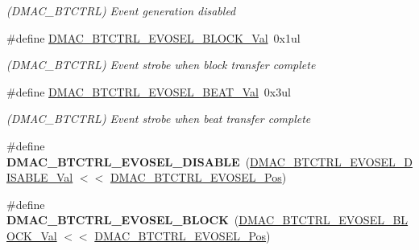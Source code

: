 \begin{DoxyCompactItemize}
\begin{DoxyCompactList}\small\item\em (D\+M\+A\+C\+\_\+\+B\+T\+C\+T\+R\+L) Event generation disabled \end{DoxyCompactList}\item 
\hypertarget{group___s_a_m_l21___d_m_a_c_gaff2ef572cd408dffc9b02f553e35031f}{}\#define \hyperlink{group___s_a_m_l21___d_m_a_c_gaff2ef572cd408dffc9b02f553e35031f}{D\+M\+A\+C\+\_\+\+B\+T\+C\+T\+R\+L\+\_\+\+E\+V\+O\+S\+E\+L\+\_\+\+B\+L\+O\+C\+K\+\_\+\+Val}~0x1ul\label{group___s_a_m_l21___d_m_a_c_gaff2ef572cd408dffc9b02f553e35031f}

\begin{DoxyCompactList}\small\item\em (D\+M\+A\+C\+\_\+\+B\+T\+C\+T\+R\+L) Event strobe when block transfer complete \end{DoxyCompactList}\item 
\hypertarget{group___s_a_m_l21___d_m_a_c_ga4b99d2ad5c89d62800f6f6d0c5fa0c3a}{}\#define \hyperlink{group___s_a_m_l21___d_m_a_c_ga4b99d2ad5c89d62800f6f6d0c5fa0c3a}{D\+M\+A\+C\+\_\+\+B\+T\+C\+T\+R\+L\+\_\+\+E\+V\+O\+S\+E\+L\+\_\+\+B\+E\+A\+T\+\_\+\+Val}~0x3ul\label{group___s_a_m_l21___d_m_a_c_ga4b99d2ad5c89d62800f6f6d0c5fa0c3a}

\begin{DoxyCompactList}\small\item\em (D\+M\+A\+C\+\_\+\+B\+T\+C\+T\+R\+L) Event strobe when beat transfer complete \end{DoxyCompactList}\item 
\hypertarget{group___s_a_m_l21___d_m_a_c_gab4d85a4d639a29948410a82a745a0a2e}{}\#define {\bfseries D\+M\+A\+C\+\_\+\+B\+T\+C\+T\+R\+L\+\_\+\+E\+V\+O\+S\+E\+L\+\_\+\+D\+I\+S\+A\+B\+L\+E}~(\hyperlink{group___s_a_m_l21___d_m_a_c_ga3edd13f0e4d5f2626d4465cc0b3c35c1}{D\+M\+A\+C\+\_\+\+B\+T\+C\+T\+R\+L\+\_\+\+E\+V\+O\+S\+E\+L\+\_\+\+D\+I\+S\+A\+B\+L\+E\+\_\+\+Val} $<$$<$ \hyperlink{group___s_a_m_l21___d_m_a_c_ga1f5b7dc4dab8086525a4bcb012d380b6}{D\+M\+A\+C\+\_\+\+B\+T\+C\+T\+R\+L\+\_\+\+E\+V\+O\+S\+E\+L\+\_\+\+Pos})\label{group___s_a_m_l21___d_m_a_c_gab4d85a4d639a29948410a82a745a0a2e}

\item 
\hypertarget{group___s_a_m_l21___d_m_a_c_gaedf2386199535e5e76dfaf2a4c3c3355}{}\#define {\bfseries D\+M\+A\+C\+\_\+\+B\+T\+C\+T\+R\+L\+\_\+\+E\+V\+O\+S\+E\+L\+\_\+\+B\+L\+O\+C\+K}~(\hyperlink{group___s_a_m_l21___d_m_a_c_gaff2ef572cd408dffc9b02f553e35031f}{D\+M\+A\+C\+\_\+\+B\+T\+C\+T\+R\+L\+\_\+\+E\+V\+O\+S\+E\+L\+\_\+\+B\+L\+O\+C\+K\+\_\+\+Val}  $<$$<$ \hyperlink{group___s_a_m_l21___d_m_a_c_ga1f5b7dc4dab8086525a4bcb012d380b6}{D\+M\+A\+C\+\_\+\+B\+T\+C\+T\+R\+L\+\_\+\+E\+V\+O\+S\+E\+L\+\_\+\+Pos})\label{group___s_a_m_l21___d_m_a_c_gaedf2386199535e5e76dfaf2a4c3c3355}


\end{DoxyCompactItemize}
